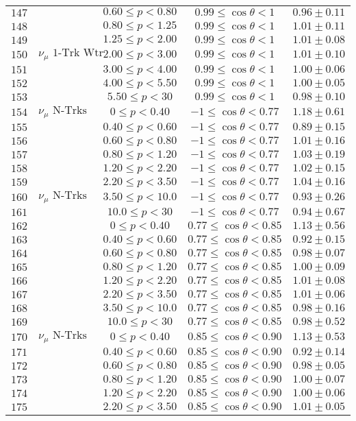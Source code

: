 \begin{longtable}[c]{ccccc}
$147$ &  & $0.60\leq p<0.80$ & $0.99\leq\cos\theta<1$ & $0.96\pm0.11$\tabularnewline
$148$ &  & $0.80\leq p<1.25$ & $0.99\leq\cos\theta<1$ & $1.01\pm0.11$\tabularnewline
$149$ &  & $1.25\leq p<2.00$ & $0.99\leq\cos\theta<1$ & $1.01\pm0.08$\tabularnewline
$150$ & $\nu_{\mu}\text{ 1-Trk Wtr }$ & $2.00\leq p<3.00$ & $0.99\leq\cos\theta<1$ & $1.01\pm0.10$\tabularnewline
$151$ &  & $3.00\leq p<4.00$ & $0.99\leq\cos\theta<1$ & $1.00\pm0.06$\tabularnewline
$152$ &  & $4.00\leq p<5.50$ & $0.99\leq\cos\theta<1$ & $1.00\pm0.05$\tabularnewline
$153$ &  & $5.50\leq p<30$ & $0.99\leq\cos\theta<1$ & $0.98\pm0.10$\tabularnewline
$154$ & $\nu_{\mu}\text{ N-Trks Wtr}$ & $0\leq p<0.40$ & $-1\leq\cos\theta<0.77$ & $1.18\pm0.61$\tabularnewline
$155$ &  & $0.40\leq p<0.60$ & $-1\leq\cos\theta<0.77$ & $0.89\pm0.15$\tabularnewline
$156$ &  & $0.60\leq p<0.80$ & $-1\leq\cos\theta<0.77$ & $1.01\pm0.16$\tabularnewline
$157$ &  & $0.80\leq p<1.20$ & $-1\leq\cos\theta<0.77$ & $1.03\pm0.19$\tabularnewline
$158$ &  & $1.20\leq p<2.20$ & $-1\leq\cos\theta<0.77$ & $1.02\pm0.15$\tabularnewline
$159$ &  & $2.20\leq p<3.50$ & $-1\leq\cos\theta<0.77$ & $1.04\pm0.16$\tabularnewline
$160$ & $\nu_{\mu}\text{ N-Trks Wtr}$ & $3.50\leq p<10.0$ & $-1\leq\cos\theta<0.77$ & $0.93\pm0.26$\tabularnewline
$161$ &  & $10.0\leq p<30$ & $-1\leq\cos\theta<0.77$ & $0.94\pm0.67$\tabularnewline
$162$ &  & $0\leq p<0.40$ & $0.77\leq\cos\theta<0.85$ & $1.13\pm0.56$\tabularnewline
$163$ &  & $0.40\leq p<0.60$ & $0.77\leq\cos\theta<0.85$ & $0.92\pm0.15$\tabularnewline
$164$ &  & $0.60\leq p<0.80$ & $0.77\leq\cos\theta<0.85$ & $0.98\pm0.07$\tabularnewline
$165$ &  & $0.80\leq p<1.20$ & $0.77\leq\cos\theta<0.85$ & $1.00\pm0.09$\tabularnewline
$166$ &  & $1.20\leq p<2.20$ & $0.77\leq\cos\theta<0.85$ & $1.01\pm0.08$\tabularnewline
$167$ &  & $2.20\leq p<3.50$ & $0.77\leq\cos\theta<0.85$ & $1.01\pm0.06$\tabularnewline
$168$ &  & $3.50\leq p<10.0$ & $0.77\leq\cos\theta<0.85$ & $0.98\pm0.16$\tabularnewline
$169$ &  & $10.0\leq p<30$ & $0.77\leq\cos\theta<0.85$ & $0.98\pm0.52$\tabularnewline
$170$ & $\nu_{\mu}\text{ N-Trks Wtr}$ & $0\leq p<0.40$ & $0.85\leq\cos\theta<0.90$ & $1.13\pm0.53$\tabularnewline
$171$ &  & $0.40\leq p<0.60$ & $0.85\leq\cos\theta<0.90$ & $0.92\pm0.14$\tabularnewline
$172$ &  & $0.60\leq p<0.80$ & $0.85\leq\cos\theta<0.90$ & $0.98\pm0.05$\tabularnewline
$173$ &  & $0.80\leq p<1.20$ & $0.85\leq\cos\theta<0.90$ & $1.00\pm0.07$\tabularnewline
$174$ &  & $1.20\leq p<2.20$ & $0.85\leq\cos\theta<0.90$ & $1.00\pm0.06$\tabularnewline
$175$ &  & $2.20\leq p<3.50$ & $0.85\leq\cos\theta<0.90$ & $1.01\pm0.05$\tabularnewline

\end{longtable}
